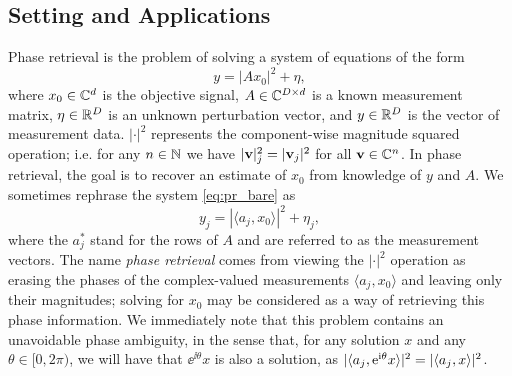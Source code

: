 \subsection{Setting and Applications}
\label{sec:intro_setting}
Phase retrieval is the problem of solving a system of equations of the form \begin{equation} y = |A x_0|^2 + \eta, \label{eq:pr_bare} \end{equation} where $x_0 \in \mathbb{C}^d$ is the objective signal, $A \in \mathbb{C}^{D \times d}$ is a known measurement matrix, $\eta \in \mathbb{R}^D$ is an unknown perturbation vector, and $y \in \mathbb{R}^D$ is the vector of measurement data.  $|\cdot|^2$ represents the component-wise magnitude squared operation; i.e. for any $n \in \mathbb{N}$ we have $|\mathbf{v}|^2_j = |\mathbf{v}_j|^2$ for all $\mathbf{v} \in \mathbb{C}^n$.  In phase retrieval, the goal is to recover an estimate of $x_0$ from knowledge of $y$ and $A$.  We sometimes rephrase the system \eqref{eq:pr_bare} as \begin{equation} y_j = | \langle a_j, x_0 \rangle |^2 + \eta_j, \end{equation} where the $a_j^*$ stand for the rows of $A$ and are referred to as the measurement vectors.  The name \emph{phase retrieval} comes from viewing the $|\cdot|^2$ operation as erasing the phases of the complex-valued measurements $\langle a_j, x_0 \rangle$ and leaving only their magnitudes; solving for $x_0$ may be considered as a way of retrieving this phase information.  We immediately note that this problem contains an unavoidable phase ambiguity, in the sense that, for any solution $x$ and any $\theta \in [0, 2\pi)$, we will have that $\ee^{\ii \theta} x$ is also a solution, as $\lvert\langle a_j, \mathrm{e}^{\mathrm{i} \theta} x\rangle\rvert^2 = \lvert\langle a_j, x\rangle\rvert^2$.

